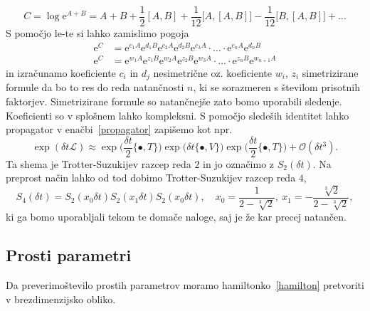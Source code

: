 \documentclass[12pt, a4paper]{article}
\renewcommand{\L}{
    \ensuremath{\mathcal{L}}
}
\newcommand{\e}{
    \ensuremath{\mathrm{e}}
}
\newcommand{\sfrac}[2]{
    \ensuremath{\textstyle{\frac{#1}{#2}}}
}
\begin{document}
\[
    C = \log{\e^{A + B}} = A + B + \sfrac{1}{2}[A,B] + \sfrac{1}{12}\big[A,[A,B]\big] -
        \sfrac{1}{12}\big[B,[A,B]\big] +\ldots
\]
S pomo\v cjo le-te si lahko zamislimo pogoja
\begin{align}
    \e^C &= \e^{c_1 A}\e^{d_1 B}\e^{c_2 A}\e^{d_2 B}\e^{c_3 A}\cdot \ldots \cdot \e^{c_n A}\e^{d_n B} \\
    \e^C &= \e^{w_1 A}\e^{z_1 B}\e^{w_2 A}\e^{z_2 B}\e^{w_3 A}\cdot \ldots \cdot \e^{z_n B}\e^{w_{n+1} A}
\end{align}
in izra\v cunamo koeficiente $c_i$ in $d_j$ nesimetri\v cne oz. koeficiente $w_i$, $z_i$ simetrizirane
formule da bo to res do reda natan\v cnosti $n$, ki se sorazmeren s \v stevilom prisotnih faktorjev.
Simetrizirane formule so natan\v cnej\v se zato bomo uporabili sledenje. Koeficienti so v splo\v snem
lahko kompleksni. S pomo\v cjo slede\v sih identitet lahko propagator v ena\v cbi~\eqref{propagator}
zapi\v semo kot npr.
\[
    \exp(\delta t\L) \approx \exp\big(\sfrac{\delta t}{2}\{\bullet, T\}\big)
    \exp\big(\delta t\{\bullet, V\}\big)
    \exp\big(\sfrac{\delta t}{2}\{\bullet, T\}\big) + \mathcal{O}(\delta t^3).
\]
Ta shema je Trotter-Suzukijev razcep reda $2$ in jo ozna\v cimo z $S_2(\delta t)$. Na preprost na\v cin
lahko od tod dobimo Trotter-Suzukijev razcep reda $4$,
\[
    S_4 (\delta t) = S_2(x_0 \delta t) S_2(x_1 \delta t) S_2(x_0 \delta t), \quad
    x_0 = \frac{1}{2 - \sqrt[3]{2}},\ x_1 = -\frac{\sqrt[3]{2}}{2 - \sqrt[3]{2}},
\]
ki ga bomo uporabljali tekom te doma\v ce naloge, saj je \v ze kar precej natan\v cen.

\subsection{Prosti parametri}

Da preverimo\v stevilo prostih parametrov moramo hamiltonko~\eqref{hamilton} pretvoriti v brezdimenzijsko
obliko.
\end{document}
